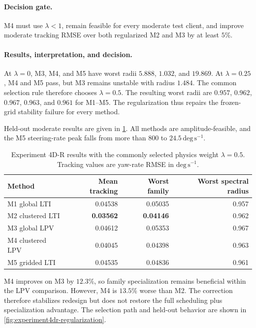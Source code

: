 \paragraph{Decision gate.}
M4 must use $\lambda<1$, remain feasible for every moderate test client, and
improve moderate tracking RMSE over both regularized M2 and M3 by at least $5\%$.

\paragraph{Results, interpretation, and decision.}
At $\lambda=0$, M3, M4, and M5 have worst radii $5.888$, $1.032$, and $19.869$.
At $\lambda=0.25$, M4 and M5 pass, but M3 remains unstable with radius $1.484$.
The common selection rule therefore chooses $\lambda=0.5$. The resulting worst
radii are $0.957$, $0.962$, $0.967$, $0.963$, and $0.961$ for M1--M5. The
regularization thus repairs the frozen-grid stability failure for every method.

Held-out moderate results are given in \cref{tab:experiment4dr-results}. All
methods are amplitude-feasible, and the M5 steering-rate peak falls from more
than $800$ to $24.5\,\mathrm{deg\,s^{-1}}$.

\begin{table}[htbp]
\centering
\caption{Experiment 4D-R results with the commonly selected physics weight
$\lambda=0.5$. Tracking values are yaw-rate RMSE in $\mathrm{deg\,s^{-1}}$.}
\label{tab:experiment4dr-results}
\begin{tabular}{lrrr}
\toprule
Method & Mean tracking & Worst family & Worst spectral radius\\
\midrule
M1 global LTI       & 0.04538 & 0.05035 & 0.957\\
M2 clustered LTI    & \textbf{0.03562} & \textbf{0.04146} & 0.962\\
M3 global LPV       & 0.04612 & 0.05353 & 0.967\\
M4 clustered LPV    & 0.04045 & 0.04398 & 0.963\\
M5 gridded LTI      & 0.04535 & 0.04836 & 0.961\\
\bottomrule
\end{tabular}
\end{table}

M4 improves on M3 by $12.3\%$, so family specialization remains beneficial
within the LPV comparison. However, M4 is $13.5\%$ worse than M2. The correction
therefore stabilizes redesign but does not restore the full scheduling plus
specialization advantage. The selection path and held-out behavior are shown in
\cref{fig:experiment4dr-regularization}.

